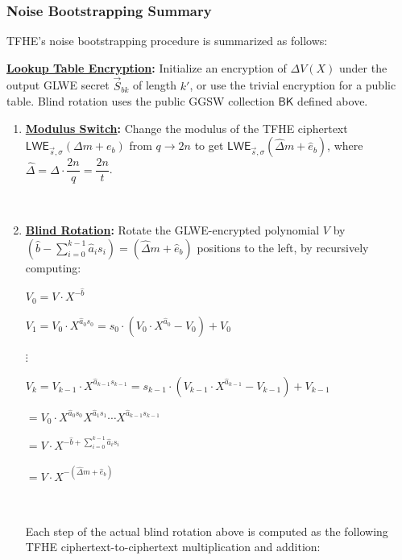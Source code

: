 \subsubsection{Noise Bootstrapping Summary}
\label{subsec:tfhe-summary}

TFHE's noise bootstrapping procedure is summarized as follows:

\begin{tcolorbox}[title={\textbf{\tboxlabel{\ref*{subsec:tfhe-summary}} TFHE Noise Bootstrapping Procedure}}]

\textbf{\underline{Lookup Table Encryption}:} Initialize an encryption of $\Delta V(X)$ under the output GLWE secret $\vec S_{bk}$ of length $k'$, or use the trivial encryption for a public table. Blind rotation uses the public GGSW collection $\textsf{BK}$ defined above.

  
\begin{enumerate}
\item \textbf{\underline{Modulus Switch}:} Change the modulus of the TFHE ciphertext $\textsf{LWE}_{\vec{s}, \sigma}(\Delta m + e_b)$ from $q \rightarrow 2n$ to get $\textsf{LWE}_{\vec{s}, \sigma}(\hat{\Delta} m + \hat e_b)$, where $\hat\Delta = \Delta \cdot \dfrac{2n}{q} = \dfrac{2n}{t}$.

$ $

\item \textbf{\underline{Blind Rotation}:} Rotate the GLWE-encrypted polynomial $V$ by $(\hat{b} - \sum\limits_{i=0}^{k-1}{\hat{a}_is_i}) = (\hat{\Delta}m + \hat{e}_b)$ positions to the left, by recursively computing: 

$V_0 = V \cdot X^{-\hat{b}}$

$V_1 = V_0 \cdot X^{\hat{a}_0s_0} = s_0 \cdot (V_0 \cdot X^{\hat{a}_0} - V_0) + V_0$

\text{ } $\vdots$

$V_k = V_{k-1} \cdot X^{\hat{a}_{k-1}s_{k-1}} = s_{k-1} \cdot (V_{k-1} \cdot X^{\hat{a}_{k-1}} - V_{k-1}) + V_{k-1}$

$= V_0 \cdot X^{\hat{a}_0s_0}X^{\hat{a}_1s_1}\cdots X^{\hat{a}_{k-1}s_{k-1}}$

$= V \cdot X^{- \hat{b} + \sum_{i=0}^{k-1}{\hat{a}_is_i}} $

$ = V \cdot X^{-(\hat{\Delta}m + \hat{e}_b)}$

$ $

\noindent Each step of the actual blind rotation above is computed as the following TFHE ciphertext-to-ciphertext multiplication and addition:


\end{enumerate}
\end{tcolorbox}
